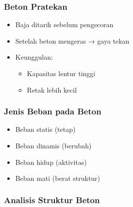 \documentclass[../main.tex]{subfiles}
\begin{document}
\begin{frame}[mytitle=standard,c,mycolor=digiPH_uniblue,light]\frametitle{Beton Pratekan}
	\begin{itemize}
		\item Baja ditarik sebelum pengecoran
		\item Setelah beton mengeras → gaya tekan
		\item Keunggulan:
		      \begin{itemize}
			      \item Kapasitas lentur tinggi
			      \item Retak lebih kecil
		      \end{itemize}
	\end{itemize}
\end{frame}

\begin{frame}[mytitle=standard,c,mycolor=digiPH_cream,light]\frametitle{Jenis Beban pada Beton}
	\begin{itemize}
		\item Beban statis (tetap)
		\item Beban dinamis (berubah)
		\item Beban hidup (aktivitas)
		\item Beban mati (berat struktur)
	\end{itemize}\end{frame}

\begin{frame}[mytitle=standard,t,mybg=bglight1,light]\frametitle{Analisis Struktur Beton}




\end{frame}
\end{document}
